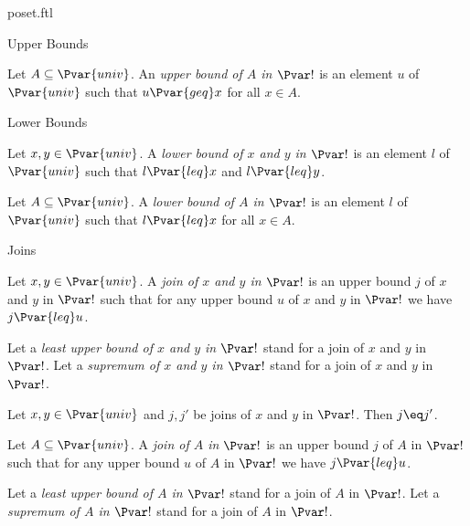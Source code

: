 \documentclass{naproche-library}
\begin{document}
\begin{smodule}[title=Posets]{poset.ftl}
\begin{sfragment}{Upper Bounds}
  \begin{definition}[forthel,id=UpperBoundOfSetDef]
    Let $A \subseteq \Pvar{univ}$.
    An \emph{upper bound of $A$ in $\Pvar!$} is an element $u$ of $\Pvar{univ}$ such that $u {\Pvar{geq}} x$ for all $x \in A$.
  \end{definition}
\end{sfragment}

\begin{sfragment}{Lower Bounds}
  \begin{definition}[forthel,id=LowerBoundOfPairDef]
    Let $x, y \in \Pvar{univ}$.
    A \emph{lower bound of $x$ and $y$ in $\Pvar!$} is an element $l$ of $\Pvar{univ}$ such that $l {\Pvar{leq}} x$ and $l {\Pvar{leq}} y$.
  \end{definition}
      
  \begin{definition}[forthel,id=LowerBoundOfSetDef]
    Let $A \subseteq \Pvar{univ}$.
    A \emph{lower bound of $A$ in $\Pvar!$} is an element $l$ of $\Pvar{univ}$ such that $l {\Pvar{leq}} x$ for all $x \in A$.
  \end{definition}
\end{sfragment}

\begin{sfragment}{Joins}
  \begin{definition}[forthel,id=JoinOfPairDef]
    Let $x, y \in \Pvar{univ}$.
    A \emph{join of $x$ and $y$ in $\Pvar!$} is an upper bound $j$ of $x$ and $y$ in $\Pvar!$ such that for any upper bound $u$ of $x$ and $y$ in $\Pvar!$ we have $j {\Pvar{leq}} u$.

    Let a \emph{least upper bound of $x$ and $y$ in $\Pvar!$} stand for a join of $x$ and $y$ in $\Pvar!$.
    Let a \emph{supremum of $x$ and $y$ in $\Pvar!$} stand for a join of $x$ and $y$ in $\Pvar!$.
  \end{definition}

  \begin{proposition}[forthel,id=JoinOfPairIsUniqueThm]
    Let $x,y\in\Pvar{univ}$ and $j, j'$ be joins of $x$ and $y$ in $\Pvar!$.
    Then $j\eq j'$.
  \end{proposition}
      
  \begin{definition}[forthel,id=JoinOfSetDef]
    Let $A \subseteq \Pvar{univ}$.
    A \emph{join of $A$ in $\Pvar!$} is an upper bound $j$ of $A$ in $\Pvar!$ such that for any upper bound $u$ of $A$ in $\Pvar!$ we have $j {\Pvar{leq}} u$.

    Let a \emph{least upper bound of $A$ in $\Pvar!$} stand for a join of $A$ in $\Pvar!$.
    Let a \emph{supremum of $A$ in $\Pvar!$} stand for a join of $A$ in $\Pvar!$.
  \end{definition}


\end{sfragment}
\end{smodule}
\end{document}
